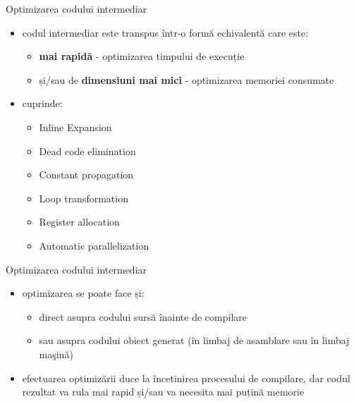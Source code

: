 \documentclass[pdf]{beamer}
\begin{document}
\begin{frame}{Optimizarea codului intermediar}
\begin{itemize}
\item 
codul intermediar este transpus într-o formă echivalentă care este: 
\begin{itemize}
\item
\textbf{mai rapidă} - optimizarea timpului de execuție
\item
și/sau de \textbf{dimensiuni mai mici} - optimizarea memoriei consumate
\end{itemize}

\item 
cuprinde:
	\begin{itemize}
	\item Inline Expansion
	\item Dead code elimination
	\item Constant propagation
	\item Loop transformation
	\item Register allocation
	\item Automatic parallelization
	\end{itemize}
\end{itemize}
\end{frame}



\begin{frame}{Optimizarea codului intermediar}
\begin{itemize}
\item
optimizarea se poate face și:
\begin{itemize}
\item
direct asupra codului sursă înainte de compilare
\item
sau asupra codului obiect generat (în limbaj de asamblare sau în limbaj ma\c{s}ină)
\end{itemize}

\item
efectuarea optimizării duce la încetinirea procesului de compilare, dar codul rezultat va rula mai rapid și/sau va necesita mai puțină memorie
\end{itemize}
\end{frame}
\end{document}
